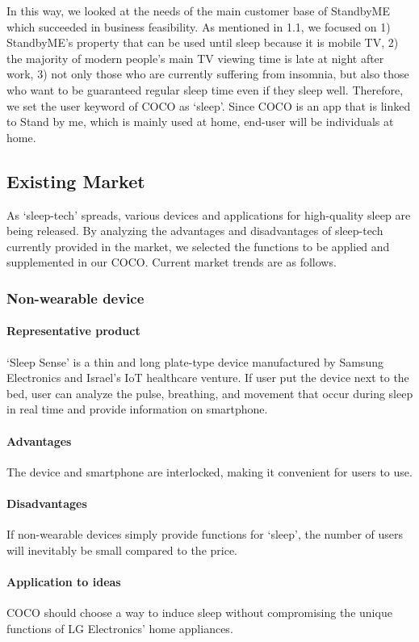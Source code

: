 \documentclass[conference]{IEEEtran}
\begin{document}
In this way, we looked at the needs of the main customer base of StandbyME which succeeded in business feasibility. As mentioned in 1.1, we focused on 1) StandbyME's property that can be used until sleep because it is mobile TV, 2) the majority of modern people's main TV viewing time is late at night after work, 3) not only those who are currently suffering from insomnia, but also those who want to be guaranteed regular sleep time even if they sleep well. Therefore, we set the user keyword of COCO as ‘sleep’. Since COCO is an app that is linked to Stand by me, which is mainly used at home, end-user will be individuals at home.
\vspace{1\baselineskip}
\subsection{Existing Market}
As ‘sleep-tech’ spreads, various devices and applications for high-quality sleep are being released. By analyzing the advantages and disadvantages of sleep-tech currently provided in the market, we selected the functions to be applied and supplemented in our COCO. Current market trends are as follows.
\vspace{1\baselineskip}
\subsubsection{Non-wearable device}
\paragraph{Representative product}
‘Sleep Sense’ is a thin and long plate-type device manufactured by Samsung Electronics and Israel's IoT healthcare venture. If user put the device next to the bed, user can analyze the pulse, breathing, and movement that occur during sleep in real time and provide information on smartphone.
\paragraph{Advantages}
The device and smartphone are interlocked, making it convenient for users to  use.
\paragraph{Disadvantages}
If non-wearable devices simply provide functions for ‘sleep’, the number of users will inevitably be small compared to the price.
\paragraph{Application to ideas}
COCO should choose a way to induce sleep without compromising the unique functions of LG Electronics' home appliances.
\vspace{1\baselineskip}
\end{document}

